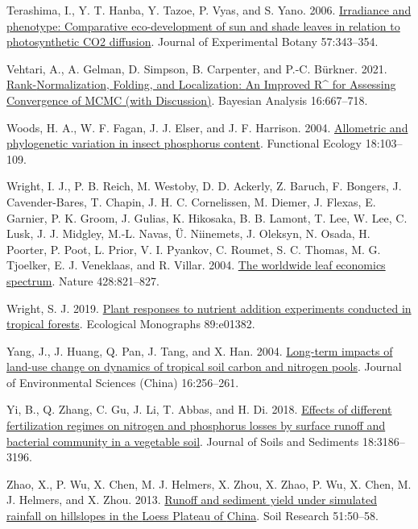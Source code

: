 \documentclass[
  12pt,
  letterpaper,
  DIV=11,
  numbers=noendperiod]{scrartcl}
\newlength{\cslhangindent}
\newlength{\cslentryspacingunit} %
\newenvironment{CSLReferences}[2] %
 {%
  \setlength{\parindent}{0pt}
  \ifodd #1
  \let\oldpar\par
  \def\par{\hangindent=\cslhangindent\oldpar}
  \fi
  \setlength{\parskip}{#2\cslentryspacingunit}
 }%
 {}
\begin{document}
\begin{CSLReferences}{1}{0}
\leavevmode{}%
Terashima, I., Y. T. Hanba, Y. Tazoe, P. Vyas, and S. Yano. 2006.
\href{https://doi.org/10.1093/jxb/erj014}{Irradiance and phenotype:
Comparative eco-development of sun and shade leaves in relation to
photosynthetic {CO2} diffusion}. Journal of Experimental Botany
57:343--354.

\leavevmode{}%
Vehtari, A., A. Gelman, D. Simpson, B. Carpenter, and P.-C. Bürkner.
2021. \href{https://doi.org/10.1214/20-BA1221}{Rank-{Normalization},
{Folding}, and {Localization}: {An Improved R\^{}} for {Assessing
Convergence} of {MCMC} (with {Discussion})}. Bayesian Analysis
16:667--718.

\leavevmode{}%
Woods, H. A., W. F. Fagan, J. J. Elser, and J. F. Harrison. 2004.
\href{https://doi.org/10.1111/j.1365-2435.2004.00823.x}{Allometric and
phylogenetic variation in insect phosphorus content}. Functional Ecology
18:103--109.

\leavevmode{}%
Wright, I. J., P. B. Reich, M. Westoby, D. D. Ackerly, Z. Baruch, F.
Bongers, J. Cavender-Bares, T. Chapin, J. H. C. Cornelissen, M. Diemer,
J. Flexas, E. Garnier, P. K. Groom, J. Gulias, K. Hikosaka, B. B.
Lamont, T. Lee, W. Lee, C. Lusk, J. J. Midgley, M.-L. Navas, Ü.
Niinemets, J. Oleksyn, N. Osada, H. Poorter, P. Poot, L. Prior, V. I.
Pyankov, C. Roumet, S. C. Thomas, M. G. Tjoelker, E. J. Veneklaas, and
R. Villar. 2004. \href{https://doi.org/10.1038/nature02403}{The
worldwide leaf economics spectrum}. Nature 428:821--827.

\leavevmode{}%
Wright, S. J. 2019. \href{https://doi.org/10.1002/ecm.1382}{Plant
responses to nutrient addition experiments conducted in tropical
forests}. Ecological Monographs 89:e01382.

\leavevmode{}%
Yang, J., J. Huang, Q. Pan, J. Tang, and X. Han. 2004.
\href{https://www.ncbi.nlm.nih.gov/pubmed/15137650}{Long-term impacts of
land-use change on dynamics of tropical soil carbon and nitrogen pools}.
Journal of Environmental Sciences (China) 16:256--261.

\leavevmode{}%
Yi, B., Q. Zhang, C. Gu, J. Li, T. Abbas, and H. Di. 2018.
\href{https://doi.org/10.1007/s11368-018-1991-6}{Effects of different
fertilization regimes on nitrogen and phosphorus losses by surface
runoff and bacterial community in a vegetable soil}. Journal of Soils
and Sediments 18:3186--3196.

\leavevmode{}%
Zhao, X., P. Wu, X. Chen, M. J. Helmers, X. Zhou, X. Zhao, P. Wu, X.
Chen, M. J. Helmers, and X. Zhou. 2013.
\href{https://doi.org/10.1071/SR12239}{Runoff and sediment yield under
simulated rainfall on hillslopes in the {Loess Plateau} of {China}}.
Soil Research 51:50--58.

\end{CSLReferences}
\end{document}
